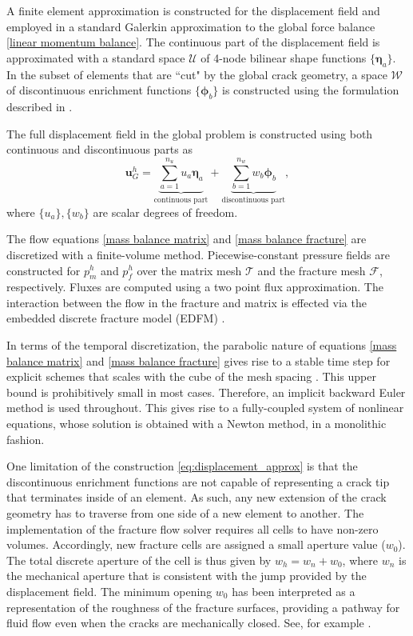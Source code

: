 A finite element approximation is constructed for the displacement field and employed in a standard Galerkin approximation to the global force balance \eqref{linear momentum balance}. The continuous part of the displacement field is approximated with a standard space $\mathcal{U}$  of 4-node bilinear shape functions $\{ {\boldsymbol{\eta}}_a \} $.  In the subset of elements that are ``cut" by the global crack geometry, a space $\mathcal{W}$ of discontinuous enrichment functions $\{\boldsymbol{\phi}_b\}$ is constructed using the formulation described in \cite{linder2007finite}.   

The full displacement field in the global problem is constructed using both continuous and discontinuous parts as
\begin{equation}
    \label{eq:displacement_approx}
    \textbf{u}^h_G = \underbrace{\sum_{a=1}^{n_u}u_a \boldsymbol{\eta}_a}_{\text{continuous part}} + \underbrace{\sum_{b=1}^{n_w}w_b\boldsymbol\phi_b}_{\text{discontinuous part}}, 
\end{equation}
where $\{u_a\}, \{ w_b\}$ are scalar degrees of freedom. 

The flow equations  \eqref{mass balance matrix} and \eqref{mass balance fracture} are discretized with a finite-volume method.   Piecewise-constant pressure fields are constructed for $p_m^h$ and $p_f^h$ over the matrix mesh $\mathcal{T}$ and the fracture mesh $\mathcal{F}$, respectively. Fluxes are computed using a two point flux approximation. The interaction between the flow in the fracture and matrix is effected via the embedded discrete fracture model (EDFM) \cite{lee2001hierarchical, hajibeygi2011hierarchical}. 

In terms of the temporal discretization, the parabolic nature of equations \eqref{mass balance matrix} and \eqref{mass balance fracture} gives rise to a stable time step for explicit schemes that scales with the cube of the mesh spacing \cite{adachi2007computer, lecampion2018numerical}. This upper bound is prohibitively small in most cases. Therefore, an implicit backward Euler method is used throughout. This gives rise to a fully-coupled system of nonlinear equations, whose solution is obtained with a Newton method, in a monolithic fashion. 

One limitation of the construction \eqref{eq:displacement_approx} is that the discontinuous enrichment functions are not capable of representing a crack tip that terminates inside of an element.  As such, any new extension of the crack geometry has to traverse from one side of a new element to another. The implementation of the fracture flow solver requires all cells to have non-zero volumes.  Accordingly, new fracture cells are assigned a  small aperture value ($w_0$). The total discrete aperture of the cell is thus given by $w_h = w_n + w_0$, where $w_n$ is the mechanical aperture that is consistent with the jump provided by the displacement field.  The minimum opening $w_0$ has been interpreted as a representation of the roughness of the fracture surfaces, providing a pathway for fluid flow even when the cracks are mechanically closed.  See, for example \cite{cusini2021simulation}.

